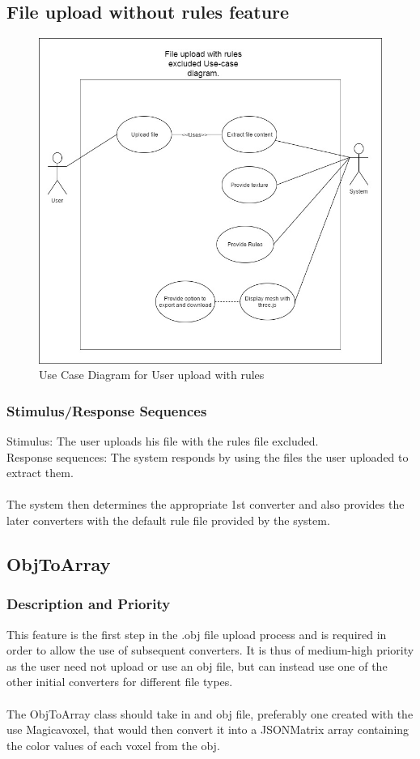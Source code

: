 \documentclass[english]{article}
\begin{document}
			 \subsection{File upload without rules feature}
				\begin{figure}[h]
					\includegraphics[width=\textwidth]{Use Cases/norules.jpg}
					\caption{Use Case Diagram for User upload with rules }
				\end{figure}
			 \subsubsection{Stimulus/Response Sequences}
			 	Stimulus: The user uploads his file with the rules file excluded.\\
			 	Response sequences: The system responds by using the files the user uploaded to extract them.\\\\
			 	 The system then determines the appropriate 1st converter and also provides the later converters with the default rule file provided by the system. 
	\pagebreak
	
		\subsection{ObjToArray}
		\subsubsection{Description and Priority}
			This feature is the first step in the .obj file upload process and is required in order to allow the use of subsequent converters. It is thus of medium-high priority as the user need not upload or use an obj file, but can instead use one of the other initial converters for different file types.\\\\
			The ObjToArray class should take in and obj file, preferably one created with the use Magicavoxel, that would then convert it into a JSONMatrix array containing the color values of each voxel from the obj.
			
\end{document}
